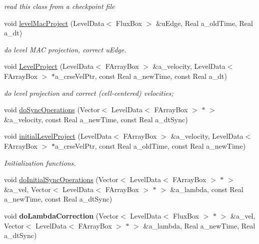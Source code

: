 \begin{DoxyCompactItemize}
\begin{DoxyCompactList}\small\item\em read this class from a checkpoint file \end{DoxyCompactList}\item 
\hypertarget{class_c_c_projector_comp_ac531708d7ee077fcf7a4182e84bea858}{void \hyperlink{class_c_c_projector_comp_ac531708d7ee077fcf7a4182e84bea858}{level\-Mac\-Project} (Level\-Data$<$ Flux\-Box $>$ \&u\-Edge, Real a\-\_\-old\-Time, Real a\-\_\-dt)}\label{class_c_c_projector_comp_ac531708d7ee077fcf7a4182e84bea858}

\begin{DoxyCompactList}\small\item\em do level M\-A\-C projection, correct u\-Edge. \end{DoxyCompactList}\item 
\hypertarget{class_c_c_projector_comp_a25c8f83dc2b375f90432f3ac10ea2c8f}{void \hyperlink{class_c_c_projector_comp_a25c8f83dc2b375f90432f3ac10ea2c8f}{Level\-Project} (Level\-Data$<$ F\-Array\-Box $>$ \&a\-\_\-velocity, Level\-Data$<$ F\-Array\-Box $>$ $\ast$a\-\_\-crse\-Vel\-Ptr, const Real a\-\_\-new\-Time, const Real a\-\_\-dt)}\label{class_c_c_projector_comp_a25c8f83dc2b375f90432f3ac10ea2c8f}

\begin{DoxyCompactList}\small\item\em do level projection and correct (cell-\/centered) velocities; \end{DoxyCompactList}\item 
void \hyperlink{class_c_c_projector_comp_a4034b2de45a765007c921ea5ac82f440}{do\-Sync\-Operations} (Vector$<$ Level\-Data$<$ F\-Array\-Box $>$ $\ast$ $>$ \&a\-\_\-velocity, const Real a\-\_\-new\-Time, const Real a\-\_\-dt\-Sync)
\item 
void \hyperlink{class_c_c_projector_comp_a9c45e46990ad64aab4b64a4792fb4014}{initial\-Level\-Project} (Level\-Data$<$ F\-Array\-Box $>$ \&a\-\_\-velocity, Level\-Data$<$ F\-Array\-Box $>$ $\ast$a\-\_\-crse\-Vel\-Ptr, const Real a\-\_\-old\-Time, const Real a\-\_\-new\-Time)
\begin{DoxyCompactList}\small\item\em Initialization functions. \end{DoxyCompactList}\item 
void \hyperlink{class_c_c_projector_comp_aa54d955bd54d01902c8ec6df448152e7}{do\-Initial\-Sync\-Operations} (Vector$<$ Level\-Data$<$ F\-Array\-Box $>$ $\ast$ $>$ \&a\-\_\-vel, Vector$<$ Level\-Data$<$ F\-Array\-Box $>$ $\ast$ $>$ \&a\-\_\-lambda, const Real a\-\_\-new\-Time, const Real a\-\_\-dt\-Sync)
\item 
\hypertarget{class_c_c_projector_comp_a25f558a3b69b9defb0dca28e153ab1ea}{void {\bfseries do\-Lambda\-Correction} (Vector$<$ Level\-Data$<$ Flux\-Box $>$ $\ast$ $>$ \&a\-\_\-vel, Vector$<$ Level\-Data$<$ F\-Array\-Box $>$ $\ast$ $>$ \&a\-\_\-lambda, Real a\-\_\-new\-Time, Real a\-\_\-dt\-Sync)}\label{class_c_c_projector_comp_a25f558a3b69b9defb0dca28e153ab1ea}


\end{DoxyCompactItemize}

